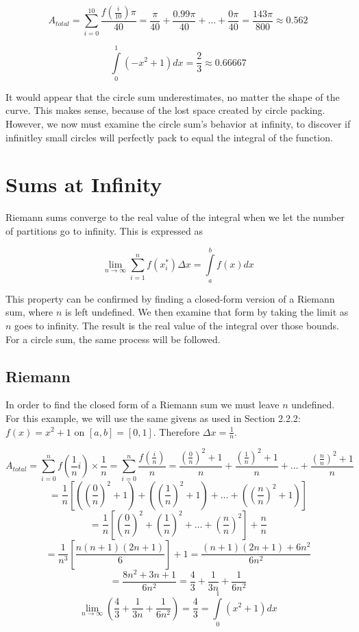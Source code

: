 \documentclass{article}
\begin{document}
    \[ A_{total} = \displaystyle \sum_{i=0}^{10} \frac{f(\frac{i}{10})\pi}{40} = \frac{\pi}{40} + \frac{0.99\pi}{40} + \dots + \frac{0\pi}{40} = \frac{143\pi}{800} \approx 0.562 \]

    \[\displaystyle \int\limits_0^1 (-x^2+1)dx = \frac{2}{3} \approx 0.66667 \]

    It would appear that the circle sum underestimates, no matter the shape of the curve. This makes sense, because of the lost space created by circle packing. However, we now must examine the circle sum's behavior at infinity, to discover if infinitley small circles will perfectly pack to equal the integral of the function.

  \section{Sums at Infinity}
    Riemann sums converge to the real value of the integral when we let the number of partitions go to infinity. This is expressed as

    \[ \displaystyle\lim_{n \to \infty}\sum_{i=1}^{n} f(x^*_i) \Delta x = \int\limits_a^b f(x)dx \]

    This property can be confirmed by finding a closed-form version of a Riemann sum, where \( n \) is left undefined. We then examine that form by taking the limit as \( n \) goes to infinity. The result is the real value of the integral over those bounds. For a circle sum, the same process will be followed.

    \subsection{Riemann}
      In order to find the closed form of a Riemann sum we must leave \( n \) undefined. For this example, we will use the same givens as used in Section 2.2.2: \( f(x) = x^2 + 1 \) on \( [a,b] = [0,1] \). Therefore \( \Delta x = \frac{1}{n} \).

      \[ A_{total} = \displaystyle\sum_{i=0}^n f(\frac{1}{n}i)\times\frac{1}{n} = \sum_{i=0}^n \frac{f(\frac{i}{n})}{n} = \frac{(\frac{0}{n})^2+1}{n} + \frac{(\frac{1}{n})^2+1}{n} + \dots + \frac{(\frac{n}{n})^2+1}{n} \]
      \[ = \frac{1}{n}\left[ \left( \left(\frac{0}{n}\right)^2 + 1 \right) + \left( \left(\frac{1}{n}\right)^2 + 1 \right) + \dots + \left( \left(\frac{n}{n}\right)^2 + 1 \right) \right] \]
      \[ = \frac{1}{n}\left[ \left( \frac{0}{n} \right)^2 + \left( \frac{1}{n} \right)^2 + \dots + \left( \frac{n}{n} \right)^2 \right] + \frac{n}{n} \]
      \[ = \frac{1}{n^3}\left[ \frac{n(n+1)(2n+1)}{6} \right] + 1 = \frac{(n+1)(2n+1) + 6n^2}{6n^2} \]
      \[ = \frac{8n^2+3n+1}{6n^2} = \frac{4}{3} + \frac{1}{3n} + \frac{1}{6n^2} \]
      \[ \displaystyle\lim_{n \to \infty}\left(\frac{4}{3} + \frac{1}{3n} + \frac{1}{6n^2} \right) = \frac{4}{3} = \int\limits_0^1 (x^2+1)dx \]
\end{document}
